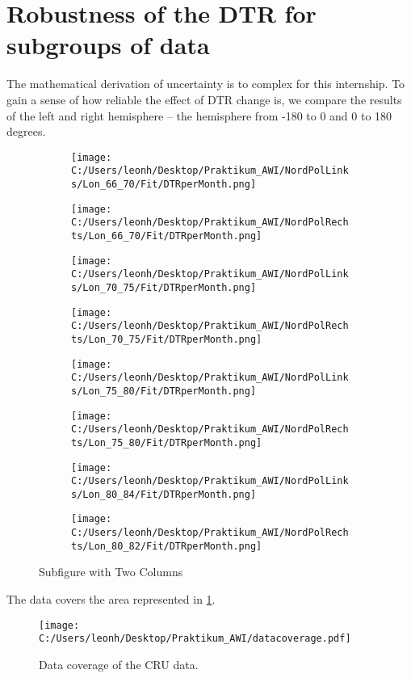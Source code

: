 \section[Robustness]{Robustness of the DTR for subgroups of data}

The mathematical derivation of uncertainty is to complex for this internship.
To gain a sense of how reliable the effect of DTR change is, we compare the 
results of the left and right hemisphere -- the hemisphere from -180 to 0 and 0 to 180 degrees. 

\begin{figure}[ht]
    \centering
    \begin{subfigure}{0.48\textwidth}
        \centering
        \texttt{[image: C:/Users/leonh/Desktop/Praktikum\_AWI/NordPolLinks/Lon\_66\_70/Fit/DTRperMonth.png]}
    \end{subfigure}%
    \begin{subfigure}{0.48\textwidth}
        \centering
        \texttt{[image: C:/Users/leonh/Desktop/Praktikum\_AWI/NordPolRechts/Lon\_66\_70/Fit/DTRperMonth.png]}
    
    \end{subfigure}

    \begin{subfigure}{0.48\textwidth}
        \centering
        \texttt{[image: C:/Users/leonh/Desktop/Praktikum\_AWI/NordPolLinks/Lon\_70\_75/Fit/DTRperMonth.png]}
    \end{subfigure}%
    \begin{subfigure}{0.48\textwidth}
        \centering
        \texttt{[image: C:/Users/leonh/Desktop/Praktikum\_AWI/NordPolRechts/Lon\_70\_75/Fit/DTRperMonth.png]}
    \end{subfigure}

    \begin{subfigure}{0.48\textwidth}
        \centering
        \texttt{[image: C:/Users/leonh/Desktop/Praktikum\_AWI/NordPolLinks/Lon\_75\_80/Fit/DTRperMonth.png]}
    \end{subfigure}%
    \begin{subfigure}{0.48\textwidth}
        \centering
        \texttt{[image: C:/Users/leonh/Desktop/Praktikum\_AWI/NordPolRechts/Lon\_75\_80/Fit/DTRperMonth.png]}
    \end{subfigure}
    
    \begin{subfigure}{0.48\textwidth}
        \centering
        \texttt{[image: C:/Users/leonh/Desktop/Praktikum\_AWI/NordPolLinks/Lon\_80\_84/Fit/DTRperMonth.png]}
    \end{subfigure}%
    \begin{subfigure}{0.48\textwidth}
        \centering
        \texttt{[image: C:/Users/leonh/Desktop/Praktikum\_AWI/NordPolRechts/Lon\_80\_82/Fit/DTRperMonth.png]}
    \end{subfigure}

    \caption{Subfigure with Two Columns}
\end{figure}

The data covers the area represented in \cref{fig:datacoverage}.

\begin{figure}[h]
    \centering
    \texttt{[image: C:/Users/leonh/Desktop/Praktikum\_AWI/datacoverage.pdf]}
    \caption[short]{Data coverage of the CRU data.}
    \label{fig:datacoverage}
\end{figure}